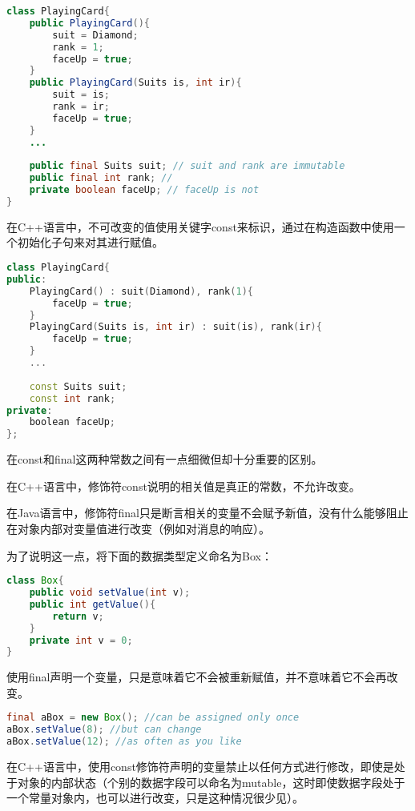 \begin{lstlisting}[language=Java]
class PlayingCard{
	public PlayingCard(){
		suit = Diamond;
		rank = 1;
		faceUp = true;
	}
	public PlayingCard(Suits is, int ir){
		suit = is;
		rank = ir;
		faceUp = true;
	}
	...
	
	public final Suits suit; // suit and rank are immutable
	public final int rank; // 
	private boolean faceUp; // faceUp is not
}
\end{lstlisting}

在C++语言中，不可改变的值使用关键字const来标识，通过在构造函数中使用一个初始化子句来对其进行赋值。


\begin{lstlisting}[language=C++]
class PlayingCard{
public:
	PlayingCard() : suit(Diamond), rank(1){
		faceUp = true;
	}
	PlayingCard(Suits is, int ir) : suit(is), rank(ir){
		faceUp = true;
	}
	...
	
	const Suits suit;
	const int rank;
private:
	boolean faceUp;
};
\end{lstlisting}

在const和final这两种常数之间有一点细微但却十分重要的区别。

\begin{compactitem}
\item 在C++语言中，修饰符const说明的相关值是真正的常数，不允许改变。
\item 在Java语言中，修饰符final只是断言相关的变量不会赋予新值，没有什么能够阻止在对象内部对变量值进行改变（例如对消息的响应）。
\end{compactitem}

为了说明这一点，将下面的数据类型定义命名为Box：

\begin{lstlisting}[language=Java]
class Box{
	public void setValue(int v);
	public int getValue(){
		return v;
	}
	private int v = 0;
}
\end{lstlisting}

使用final声明一个变量，只是意味着它不会被重新赋值，并不意味着它不会再改变。



\begin{lstlisting}[language=Java]
final aBox = new Box(); //can be assigned only once
aBox.setValue(8); //but can change
aBox.setValue(12); //as often as you like
\end{lstlisting}

在C++语言中，使用const修饰符声明的变量禁止以任何方式进行修改，即使是处于对象的内部状态（个别的数据字段可以命名为mutable，这时即使数据字段处于一个常量对象内，也可以进行改变，只是这种情况很少见）。


